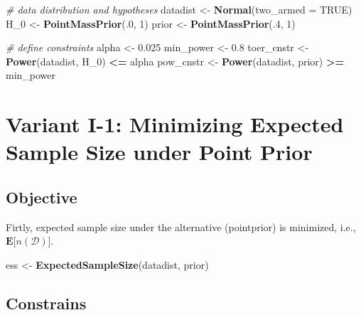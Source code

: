 \documentclass[]{book}
\newenvironment{Shaded}{\begin{snugshade}}{\end{snugshade}}
\newcommand{\CommentTok}[1]{\textcolor[rgb]{0.56,0.35,0.01}{\textit{#1}}}
\newcommand{\DataTypeTok}[1]{\textcolor[rgb]{0.13,0.29,0.53}{#1}}
\newcommand{\DecValTok}[1]{\textcolor[rgb]{0.00,0.00,0.81}{#1}}
\newcommand{\FloatTok}[1]{\textcolor[rgb]{0.00,0.00,0.81}{#1}}
\newcommand{\KeywordTok}[1]{\textcolor[rgb]{0.13,0.29,0.53}{\textbf{#1}}}
\newcommand{\NormalTok}[1]{#1}
\newcommand{\OperatorTok}[1]{\textcolor[rgb]{0.81,0.36,0.00}{\textbf{#1}}}
\newcommand{\OtherTok}[1]{\textcolor[rgb]{0.56,0.35,0.01}{#1}}
\newcommand{\StringTok}[1]{\textcolor[rgb]{0.31,0.60,0.02}{#1}}
\begin{document}
\begin{Shaded}
\begin{Highlighting}[]
\CommentTok{# data distribution and hypotheses}
\NormalTok{datadist   <-}\StringTok{ }\KeywordTok{Normal}\NormalTok{(}\DataTypeTok{two_armed =} \OtherTok{TRUE}\NormalTok{)}
\NormalTok{H_}\DecValTok{0}\NormalTok{        <-}\StringTok{ }\KeywordTok{PointMassPrior}\NormalTok{(.}\DecValTok{0}\NormalTok{, }\DecValTok{1}\NormalTok{)}
\NormalTok{prior      <-}\StringTok{ }\KeywordTok{PointMassPrior}\NormalTok{(.}\DecValTok{4}\NormalTok{, }\DecValTok{1}\NormalTok{)}

\CommentTok{# define constraints}
\NormalTok{alpha      <-}\StringTok{ }\FloatTok{0.025}
\NormalTok{min_power  <-}\StringTok{ }\FloatTok{0.8}
\NormalTok{toer_cnstr <-}\StringTok{ }\KeywordTok{Power}\NormalTok{(datadist, H_}\DecValTok{0}\NormalTok{)   }\OperatorTok{<=}\StringTok{ }\NormalTok{alpha}
\NormalTok{pow_cnstr  <-}\StringTok{ }\KeywordTok{Power}\NormalTok{(datadist, prior) }\OperatorTok{>=}\StringTok{ }\NormalTok{min_power}
\end{Highlighting}
\end{Shaded}

\hypertarget{variantI_1}{%
\section{Variant I-1: Minimizing Expected Sample Size under Point Prior}\label{variantI_1}}

\hypertarget{objective}{%
\subsection{Objective}\label{objective}}

Firtly, expected sample size under the alternative (pointprior)
is minimized, i.e.,
\(\boldsymbol{E}\big[n(\mathcal{D})\big]\).

\begin{Shaded}
\begin{Highlighting}[]
\NormalTok{ess <-}\StringTok{ }\KeywordTok{ExpectedSampleSize}\NormalTok{(datadist, prior)}
\end{Highlighting}
\end{Shaded}

\hypertarget{constrains}{%
\subsection{Constrains}\label{constrains}}
\end{document}

